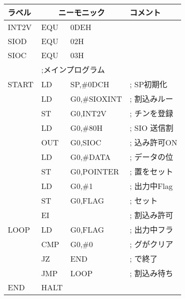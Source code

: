 \begin{figure}[btp]
{\small\tt\begin{center}
\begin{tabular}{|l|l l l|} \hline
ラベル & \multicolumn{2}{|c}{ニーモニック} & コメント  \\
\hline
INT2V   & EQU   & 0DEH               &                   \\
SIOD    & EQU   & 02H                &                   \\
SIOC    & EQU   & 03H                &                   \\
        & \multicolumn{3}{|l|}{;メインプログラム}        \\
START   & LD    & SP,\#0DCH          & ; SP初期化        \\
        & LD    & G0,\#SIOXINT       & ; 割込みルー      \\
        & ST    & G0,INT2V           & ; チンを登録      \\
        & LD    & G0,\#80H           & ; SIO 送信割      \\
        & OUT   & G0,SIOC            & ; 込み許可ON      \\
        & LD    & G0,\#DATA          & ; データの位      \\
        & ST    & G0,POINTER         & ; 置をセット      \\
        & LD    & G0,\#1             & ; 出力中Flag      \\
        & ST    & G0,FLAG            & ; セット          \\
        & EI    &                    & ; 割込み許可      \\
LOOP    & LD    & G0,FLAG            & ; 出力中フラ      \\
        & CMP   & G0,\#0             & ; グがクリア      \\
        & JZ    & END                & ; で終了          \\
        & JMP   & LOOP               & ; 割込み待ち      \\
END     & HALT  &                    &                   \\

\end{tabular}
\end{center}}
\end{figure}
